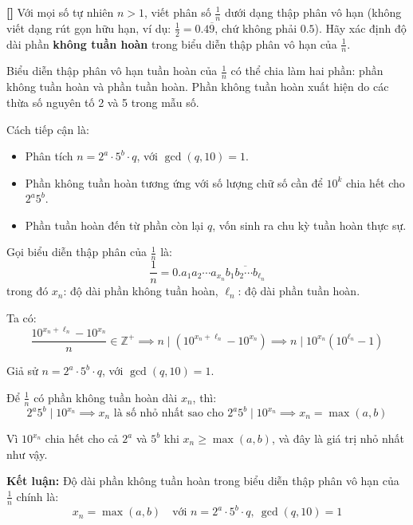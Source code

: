 \documentclass[../01-divisibility.tex]{subfiles}
\begin{document}
\begin{example*}\label{example:IND-2015-N2}\textbf{[]}
	Với mọi số tự nhiên \( n > 1 \), viết phân số \( \frac{1}{n} \) dưới dạng thập phân vô hạn (không viết dạng rút gọn hữu hạn,
	ví dụ: \( \frac{1}{2} = 0.4\overline{9} \), chứ không phải \( 0.5 \)).
	Hãy xác định độ dài phần \textbf{không tuần hoàn} trong biểu diễn thập phân vô hạn của \( \frac{1}{n} \).
\end{example*}

\begin{story*}
	Biểu diễn thập phân vô hạn tuần hoàn của \( \frac{1}{n} \) có thể chia làm hai phần: phần không tuần hoàn và phần tuần hoàn.
	Phần không tuần hoàn xuất hiện do các thừa số nguyên tố 2 và 5 trong mẫu số.

	Cách tiếp cận là:
	\begin{itemize}[topsep=0pt, partopsep=0pt, itemsep=0pt]
	    \item Phân tích \( n = 2^a \cdot 5^b \cdot q \), với \( \gcd(q, 10) = 1 \).
	    \item Phần không tuần hoàn tương ứng với số lượng chữ số cần để \( 10^k \) chia hết cho \( 2^a 5^b \).
	    \item Phần tuần hoàn đến từ phần còn lại \( q \), vốn sinh ra chu kỳ tuần hoàn thực sự.
	\end{itemize}
\end{story*}

\bigbreak

\begin{soln}\footnotemark
	Gọi biểu diễn thập phân của \( \frac{1}{n} \) là:
	\[
		\frac{1}{n} = 0.a_1a_2 \cdots a_{x_n} \overline{b_1b_2 \cdots b_{\ell_n}}
	\]
	trong đó \( x_n \): độ dài phần không tuần hoàn, \( \ell_n \): độ dài phần tuần hoàn.
	
	Ta có:
	\[
		\frac{10^{x_n + \ell_n} - 10^{x_n}}{n} \in \mathbb{Z}^+
		\implies n \mid \left(10^{x_n + \ell_n} - 10^{x_n}\right)
		\implies n \mid 10^{x_n}(10^{\ell_n} - 1)
	\]
	
	Giả sử \( n = 2^a \cdot 5^b \cdot q \), với \( \gcd(q,10)=1 \).

	Để \( \frac{1}{n} \) có phần không tuần hoàn dài \( x_n \), thì:
	\[
		2^a 5^b \mid 10^{x_n}
		\implies x_n \text{ là số nhỏ nhất sao cho } 2^a 5^b \mid 10^{x_n}
		\implies x_n = \max(a, b)
	\]

	Vì \( 10^{x_n} \) chia hết cho cả \( 2^a \) và \( 5^b \) khi \( x_n \geq \max(a, b) \), và đây là giá trị nhỏ nhất như vậy.

	\textbf{Kết luận:} Độ dài phần không tuần hoàn trong biểu diễn thập phân vô hạn của \( \frac{1}{n} \) chính là:
	\[
		x_n = \max(a, b)\quad \text{với } n = 2^a \cdot 5^b \cdot q,\ \gcd(q, 10) = 1
	\]	
\end{soln}

\end{document}
